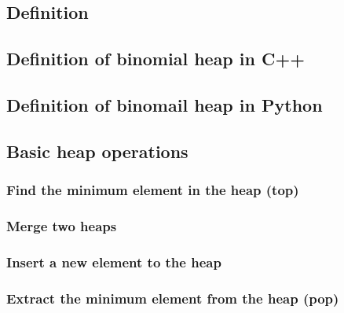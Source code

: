 \documentclass{article}
\begin{document}
\subsection{Definition}


\subsection*{Definition of binomial heap in C++}

\subsection*{Definition of binomail heap in Python}

\subsection{Basic heap operations}

\subsubsection{Find the minimum element in the heap (top)}

\subsubsection{Merge two heaps}

\subsubsection{Insert a new element to the heap}

\subsubsection{Extract the minimum element from the heap (pop)}
\end{document}

